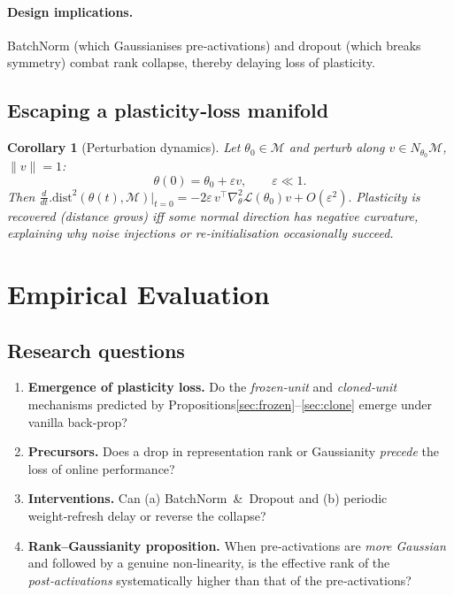 \documentclass[11pt]{article}
\newcommand{\Loss}{\mathcal{L}}
\newtheorem{corollary}{Corollary}[section]
\begin{document}
\paragraph{Design implications.}
BatchNorm (which Gaussianises pre‑activations) and dropout (which breaks symmetry) combat rank collapse, thereby delaying loss of plasticity.

\subsection{Escaping a plasticity‑loss manifold}

\begin{corollary}[Perturbation dynamics]
\label{cor:perturb}
Let $\theta_0\in\mathcal{M}$ and perturb along $v\in N_{\theta_0}\mathcal{M}$, $\|v\|=1$:
\[
\theta(0)=\theta_0+\varepsilon v,\qquad \varepsilon\ll1.
\]
Then
\(
\frac{d}{dt}\bigl.\mathrm{dist}^2(\theta(t),\mathcal{M})\bigr|_{t=0}
=-2\varepsilon\,v^\top\nabla_\theta^2\Loss(\theta_0)v+O(\varepsilon^2).
\)
Plasticity is recovered (distance grows) iff some normal direction has negative curvature, explaining why noise injections or re‑initialisation occasionally succeed.
\end{corollary}
\section{Empirical Evaluation}
\label{sec:experiments}

\subsection{Research questions}

\begin{enumerate}[label=(Q\arabic*)]
  \item \textbf{Emergence of plasticity loss.}  
        Do the \emph{frozen‑unit} and \emph{cloned‑unit} mechanisms
        predicted by Propositions\ref{sec:frozen}–\ref{sec:clone} emerge
        under vanilla back‑prop?
  \item \textbf{Precursors.}  
        Does a drop in representation rank or Gaussianity
        \emph{precede} the loss of online performance?
  \item \textbf{Interventions.}  
        Can (a) BatchNorm \& Dropout and (b) periodic
        weight‑refresh delay or reverse the collapse?
  \item \textbf{Rank–Gaussianity proposition.}  
        When pre‑activations are \emph{more Gaussian}
        and followed by a genuine non‑linearity,
        is the effective rank of the \emph{post‑activations}
        systematically higher than that of the pre‑activations?
\end{enumerate}
\end{document}
